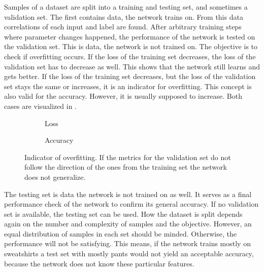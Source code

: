 Samples of a dataset are split into a training and testing set, and sometimes a validation set\cite{James2014}.
The first contains data, the network trains on.
From this data correlations of each input and label are found.
After arbitrary training steps where parameter changes happened, the performance of the network is tested on the validation set.
This is data, the network is not trained on.
The objective is to check if overfitting occurs.
If the loss of the training set decreases, the loss of the validation set has to decrease as well.
This shows that the network still learns and gets better.
If the loss of the training set decreases, but the loss of the validation set stays the same or increases, it is an indicator for overfitting.
This concept is also valid for the accuracy.
However, it is usually supposed to increase.
Both cases are visualized in .
\begin{figure}
	\setlength{}
	\setlength{}
	\centering
	\begin{subfigure}{.5\textwidth}
		
		\caption[Loss]{Loss}
	\end{subfigure}%
	\begin{subfigure}{.5\textwidth}
		
		\caption[Accuracy]{Accuracy}
	\end{subfigure}
	\caption[Indicator of overfitting]{Indicator of overfitting. If the metrics for the validation set do not follow the direction of the ones from the training set the network does not generalize.}
	\label{fig:overfitting}
\end{figure}

The testing set is data the network is not trained on as well.
It serves as a final performance check of the network to confirm its general accuracy.
If no validation set is available, the testing set can be used.
How the dataset is split depends again on the number and complexity of samples and the objective.
However, an equal distribution of samples in each set should be minded.
Otherwise, the performance will not be satisfying.
This means, if the network trains mostly on sweatshirts a test set with mostly pants would not yield an acceptable accuracy, because the network does not know these particular features.

